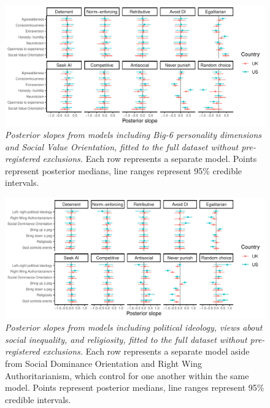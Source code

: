 \documentclass[
  man,floatsintext]{apa6}
\begin{document}
\begin{figure}
\centering
\includegraphics{manuscript_files/figure-latex/plotAllPers1-1.pdf}
\caption{\label{fig:plotAllPers1}\emph{Posterior slopes from models including Big-6
personality dimensions and Social Value Orientation, fitted to the full dataset
without pre-registered exclusions.} Each row represents a separate model. Points
represent posterior medians, line ranges represent 95\% credible intervals.}
\end{figure}

\newpage








\begin{figure}
\centering
\includegraphics{manuscript_files/figure-latex/plotAllPolRel1-1.pdf}
\caption{\label{fig:plotAllPolRel1}\emph{Posterior slopes from models including political
ideology, views about social inequality, and religiosity, fitted to the full
dataset without pre-registered exclusions.} Each row represents a separate model
aside from Social Dominance Orientation and Right Wing Authoritarianism, which
control for one another within the same model. Points represent posterior
medians, line ranges represent 95\% credible intervals.}
\end{figure}
\end{document}
